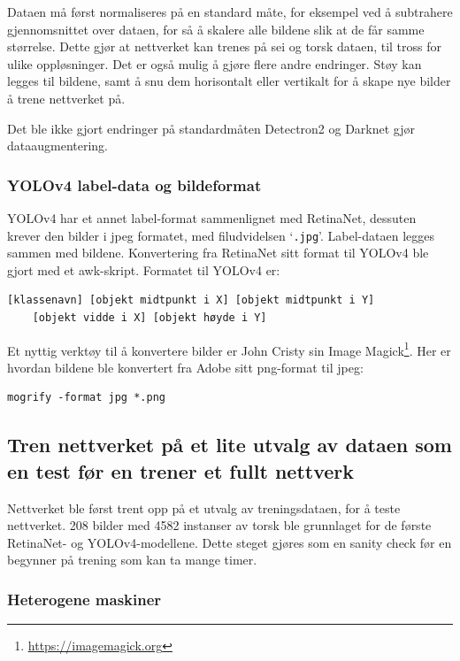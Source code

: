 Dataen må først normaliseres på en standard måte, for eksempel ved å subtrahere gjennomsnittet over dataen, for så å skalere alle bildene slik at de får samme størrelse. Dette gjør at nettverket kan trenes på sei og torsk dataen, til tross for ulike oppløsninger. Det er også mulig å gjøre flere andre endringer. Støy kan legges til bildene, samt å snu dem horisontalt eller vertikalt for å skape nye bilder å trene nettverket på. \cite{Cadieu m.fl. 2014 s. 15}

Det ble ikke gjort endringer på standardmåten Detectron2 og Darknet gjør dataaugmentering.

\subsubsection{YOLOv4 label-data og bildeformat}

YOLOv4 har et annet label-format sammenlignet med RetinaNet, dessuten krever den bilder i jpeg formatet, med filudvidelsen `\texttt{.jpg}'. Label-dataen legges sammen med bildene. Konvertering fra RetinaNet sitt format til YOLOv4 ble gjort med et awk-skript. Formatet til YOLOv4 er:

\begin{verbatim}
[klassenavn] [objekt midtpunkt i X] [objekt midtpunkt i Y]
	[objekt vidde i X] [objekt høyde i Y]
\end{verbatim}

Et nyttig verktøy til å konvertere bilder er John Cristy sin Image Magick\footnote{\url{https://imagemagick.org}}. Her er hvordan bildene ble konvertert fra Adobe sitt png-format til jpeg:

\begin{verbatim}
mogrify -format jpg *.png
\end{verbatim}

\subsection{Tren nettverket på et lite utvalg av dataen som en test før en trener et fullt nettverk}

Nettverket ble først trent opp på et utvalg av treningsdataen, for å teste nettverket. 208 bilder med 4582 instanser av torsk ble grunnlaget for de første RetinaNet- og YOLOv4-modellene. Dette steget gjøres som en sanity check før en begynner på trening som kan ta mange timer.

\subsubsection{Heterogene maskiner}

